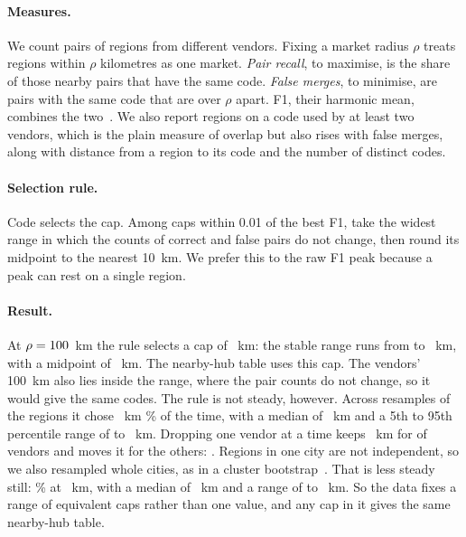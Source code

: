 \documentclass[10pt,twocolumn]{article}
\begin{document}
\paragraph{Measures.} We count pairs of regions from different vendors. Fixing a market radius $\rho$ treats regions within $\rho$ kilometres as one market. \emph{Pair recall}, to maximise, is the share of those nearby pairs that have the same code. \emph{False merges}, to minimise, are pairs with the same code that are over $\rho$ apart. F1, their harmonic mean, combines the two~\citep{vanrijsbergen1979information}. We also report regions on a code used by at least two vendors, which is the plain measure of overlap but also rises with false merges, along with distance from a region to its code and the number of distinct codes.

\paragraph{Selection rule.} Code selects the cap. Among caps within 0.01 of the best F1, take the widest range in which the counts of correct and false pairs do not change, then round its midpoint to the nearest 10~km. We prefer this to the raw F1 peak because a peak can rest on a single region.

\paragraph{Result.} At $\rho=100$~km the rule selects a cap of \capSelected{}~km: the stable range runs from \capLow{} to \capHigh{}~km, with a midpoint of \capMidpoint{}~km. The nearby-hub table uses this cap. The vendors' 100~km also lies inside the range, where the pair counts do not change, so it would give the same codes. The rule is not steady, however. Across \capRuleRuns{} resamples of the regions it chose \capSelected{}~km \capRuleShare{}\% of the time, with a median of \capRuleMedian{}~km and a 5th to 95th percentile range of \capRuleLow{} to \capRuleHigh{}~km. Dropping one vendor at a time keeps \capSelected{}~km for \capRuleKept{} of \capRuleVendors{} vendors and moves it for the others: \capRuleMoved{}. Regions in one city are not independent, so we also resampled whole cities, as in a cluster bootstrap~\citep{field2007bootstrapping}. That is less steady still: \capCityShare{}\% at \capSelected{}~km, with a median of \capCityMedian{}~km and a range of \capCityLow{} to \capCityHigh{}~km. So the data fixes a range of equivalent caps rather than one value, and any cap in it gives the same nearby-hub table.
\end{document}
